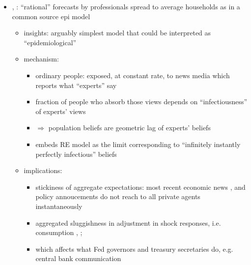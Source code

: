 \begin{itemize}
	\item \cite{carroll2003macroeconomic}, \href{http://www.econ2.jhu.edu/people/ccarroll/epidemiologySFI.pdf}{\cite{carroll2005epidemiology}}: ``rational'' forecasts by professionals spread to average households as in a common source epi model
	\begin{itemize}
		\item insights:  arguably simplest model that could be interpreted as ``epidemiological''
		\item mechanism:
		\begin{itemize}
			\item
			ordinary people: exposed, at constant rate, to news media which reports what ``experts'' say
			\item
			fraction of people who absorb those views depends on ``infectiousness'' of experts' views
			\item $\Rightarrow$ population beliefs are geometric lag of experts' beliefs
			\item
			embeds RE model as the limit corresponding to ``infinitely instantly
			perfectly infectious'' beliefs
		\end{itemize}
		\item implications:
		\begin{itemize}
			\item
			stickiness of aggregate expectations: most recent economic news \href{http://www.econ2.jhu.edu/people/ccarroll/epidemiologySFI.pdf}{\cite{carroll2005epidemiology}}, \href{http://www.econ2.jhu.edu/people/ccarroll/epidemiologyQJE.pdf}{\cite{carroll2003macroeconomic}} and policy annoucements  \href{https://www.tcd.ie/Economics/staff/waltis/EC2010/ec2010_ps5ans.pdf}{\cite{berger2011monetary}} do not reach to all private agents instantaneously
			\item aggregated sluggishness in adjustment in shock responses, i.e. consumption \href{https://www.ecb.europa.eu/pub/pdf/scpwps/ecb.wp2152.en.pdf}{\cite{carroll2020sticky}},  \href{https://www.nber.org/papers/w26647}{\cite{auclert2020micro}};
			\item
			which affects what Fed governors and treasury secretaries do, e.g. central bank communication
		\end{itemize}
	\end{itemize}


\end{itemize}
